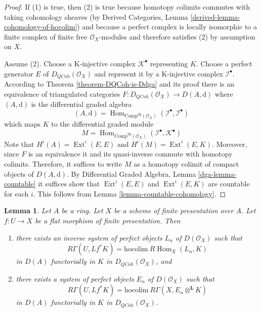 \documentclass{stacks-project}
\theoremstyle{plain}
\newtheorem{lemma}[subsection]{Lemma}
\theoremstyle{definition}
\theoremstyle{remark}
\numberwithin{equation}{subsection}
\def\Hom{\mathop{\mathrm{Hom}}\nolimits}
\def\Ext{\mathop{\mathrm{Ext}}\nolimits}
\def\QCoh{\mathit{QCoh}}
\begin{document}
\begin{proof}
If (1) is true, then (2) is true because homotopy colimits commutes
with taking cohomology sheaves
(by Derived Categories, Lemma \ref{derived-lemma-cohomology-of-hocolim})
and because a perfect complex is
locally isomorphic to a finite complex of finite free $\mathcal{O}_X$-modules
and therefore satisfies (2) by assumption on $X$.

\medskip\noindent
Assume (2).
Choose a K-injective complex $\mathcal{K}^\bullet$ representing $K$.
Choose a perfect generator $E$ of $D_\QCoh(\mathcal{O}_X)$ and
represent it by a K-injective complex $\mathcal{I}^\bullet$.
According to Theorem \ref{theorem-DQCoh-is-Ddga}
and its proof there is an equivalence
of triangulated categories $F : D_\QCoh(\mathcal{O}_X) \to D(A, \text{d})$
where $(A, \text{d})$ is the differential graded algebra
$$
(A, \text{d}) =
\Hom_{\text{Comp}^{dg}(\mathcal{O}_X)}
(\mathcal{I}^\bullet, \mathcal{I}^\bullet)
$$
which maps $K$ to the differential graded module
$$
M = \Hom_{\text{Comp}^{dg}(\mathcal{O}_X)}
(\mathcal{I}^\bullet, \mathcal{K}^\bullet)
$$
Note that $H^i(A) = \Ext^i(E, E)$ and
$H^i(M) = \Ext^i(E, K)$.
Moreover, since $F$ is an equivalence it and its quasi-inverse commute
with homotopy colimits.
Therefore, it suffices to write $M$ as a homotopy colimit
of compact objects of $D(A, \text{d})$.
By Differential Graded Algebra, Lemma \ref{dga-lemma-countable}
it suffices show that $\Ext^i(E, E)$ and
$\Ext^i(E, K)$ are countable for each $i$.
This follows from Lemma \ref{lemma-countable-cohomology}.
\end{proof}

\begin{lemma}
\label{lemma-computing-sections-as-colim}
Let $A$ be a ring. Let $X$ be a scheme of finite presentation over $A$.
Let $f : U \to X$ be a flat morphism of finite presentation. Then
\begin{enumerate}
\item there exists an inverse system of perfect objects $L_n$ of
$D(\mathcal{O}_X)$ such that
$$
R\Gamma(U, Lf^*K) = \text{hocolim}\ R\Hom_X(L_n, K)
$$
in $D(A)$ functorially in $K$ in $D_\QCoh(\mathcal{O}_X)$, and
\item there exists a system of perfect objects $E_n$ of
$D(\mathcal{O}_X)$ such that
$$
R\Gamma(U, Lf^*K) = \text{hocolim}\ R\Gamma(X, E_n \otimes^\mathbf{L} K)
$$
in $D(A)$ functorially in $K$ in $D_\QCoh(\mathcal{O}_X)$.
\end{enumerate}
\end{lemma}
\end{document}
